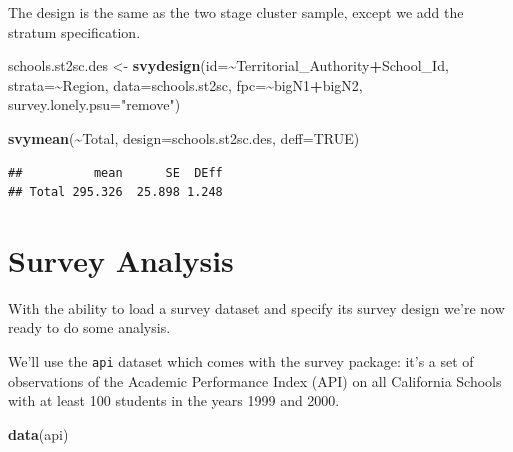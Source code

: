 \documentclass[
]{book}
\newenvironment{Shaded}{\begin{snugshade}}{\end{snugshade}}
\newcommand{\AttributeTok}[1]{\textcolor[rgb]{0.13,0.29,0.53}{#1}}
\newcommand{\ConstantTok}[1]{\textcolor[rgb]{0.56,0.35,0.01}{#1}}
\newcommand{\FunctionTok}[1]{\textcolor[rgb]{0.13,0.29,0.53}{\textbf{#1}}}
\newcommand{\NormalTok}[1]{#1}
\newcommand{\OtherTok}[1]{\textcolor[rgb]{0.56,0.35,0.01}{#1}}
\newcommand{\SpecialCharTok}[1]{\textcolor[rgb]{0.81,0.36,0.00}{\textbf{#1}}}
\newcommand{\StringTok}[1]{\textcolor[rgb]{0.31,0.60,0.02}{#1}}
\begin{document}
The design is the same as the two stage cluster sample, except we add the stratum specification.

\begin{Shaded}
\begin{Highlighting}[]
\NormalTok{schools.st2sc.des }\OtherTok{\textless{}{-}} \FunctionTok{svydesign}\NormalTok{(}\AttributeTok{id=}\SpecialCharTok{\textasciitilde{}}\NormalTok{Territorial\_Authority}\SpecialCharTok{+}\NormalTok{School\_Id, }\AttributeTok{strata=}\SpecialCharTok{\textasciitilde{}}\NormalTok{Region, }
                               \AttributeTok{data=}\NormalTok{schools.st2sc, }
                               \AttributeTok{fpc=}\SpecialCharTok{\textasciitilde{}}\NormalTok{bigN1}\SpecialCharTok{+}\NormalTok{bigN2,}
                               \AttributeTok{survey.lonely.psu=}\StringTok{"remove"}\NormalTok{)}
\end{Highlighting}
\end{Shaded}

\begin{Shaded}
\begin{Highlighting}[]
\FunctionTok{svymean}\NormalTok{(}\SpecialCharTok{\textasciitilde{}}\NormalTok{Total, }\AttributeTok{design=}\NormalTok{schools.st2sc.des, }\AttributeTok{deff=}\ConstantTok{TRUE}\NormalTok{)}
\end{Highlighting}
\end{Shaded}

\begin{verbatim}
##          mean      SE  DEff
## Total 295.326  25.898 1.248
\end{verbatim}

\chapter{Survey Analysis}\label{survey-analysis}

With the ability to load a survey dataset and specify its survey design
we're now ready to do some analysis.

We'll use the \texttt{api} dataset which comes with the survey package: it's a
set of observations of the Academic Performance Index (API) on all
California Schools with at least 100 students in the years 1999 and 2000.

\begin{Shaded}
\begin{Highlighting}[]
\FunctionTok{data}\NormalTok{(api)}
\end{Highlighting}
\end{Shaded}
\end{document}
